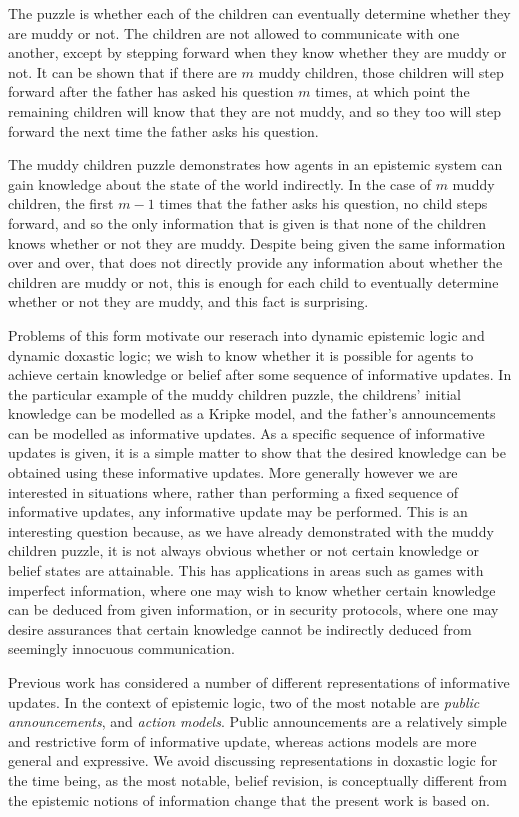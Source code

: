 The puzzle is whether each of the children can eventually determine whether
they are muddy or not. The children are not allowed to communicate with one
another, except by stepping forward when they know whether they are muddy or
not. It can be shown that if there are $m$ muddy children, those children will
step forward after the father has asked his question $m$ times, at which point
the remaining children will know that they are not muddy, and so they too will
step forward the next time the father asks his question.

The muddy children puzzle demonstrates how agents in an epistemic system can
gain knowledge about the state of the world indirectly. In the case of $m$ muddy
children, the first $m - 1$ times that the father asks his question, no child
steps forward, and so the only information that is given is that none of the
children knows whether or not they are muddy. Despite being given the same
information over and over, that does not directly provide any information about
whether the children are muddy or not, this is enough for each child to
eventually determine whether or not they are muddy, and this fact is surprising.

Problems of this form motivate our reserach into dynamic epistemic logic and
dynamic doxastic logic; we wish to know whether it is possible for agents to
achieve certain knowledge or belief after some sequence of informative updates.
In the particular example of the muddy children puzzle, the childrens' initial
knowledge can be modelled as a Kripke model, and the father's announcements can
be modelled as informative updates. As a specific sequence of informative
updates is given, it is a simple matter to show that the desired knowledge can
be obtained using these informative updates. More generally however we are
interested in situations where, rather than performing a fixed sequence of
informative updates, any informative update may be performed.  This is an
interesting question because, as we have already demonstrated with the muddy
children puzzle, it is not always obvious whether or not certain knowledge or
belief states are attainable. This has applications in areas such as games with
imperfect information, where one may wish to know whether certain knowledge can
be deduced from given information, or in security protocols, where one may
desire assurances that certain knowledge cannot be indirectly deduced from
seemingly innocuous communication.

Previous work has considered a number of different representations of
informative updates. In the context of epistemic logic, two of the most notable
are {\em public announcements}, and {\em action models}. Public announcements
are a relatively simple and restrictive form of informative update, whereas
actions models are more general and expressive. We avoid discussing
representations in doxastic logic for the time being, as the most notable,
belief revision, is conceptually different from the epistemic notions of
information change that the present work is based on.

